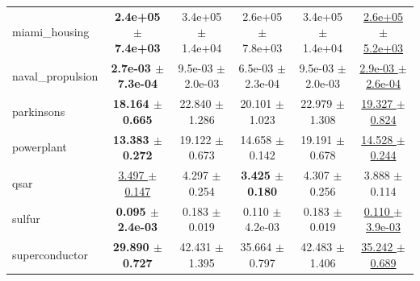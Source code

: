 \begin{table}[!htbp]
{\begin{tabular}{lccccc}
miami\_housing & \textbf{2.4e+05 $\pm$ 7.4e+03} & 3.4e+05 $\pm$ 1.4e+04 & 2.6e+05 $\pm$ 7.8e+03 & 3.4e+05 $\pm$ 1.4e+04 & \underline{2.6e+05 $\pm$ 5.2e+03} \\
naval\_propulsion & \textbf{2.7e-03 $\pm$ 7.3e-04} & 9.5e-03 $\pm$ 2.0e-03 & 6.5e-03 $\pm$ 2.3e-04 & 9.5e-03 $\pm$ 2.0e-03 & \underline{2.9e-03 $\pm$ 2.6e-04} \\
parkinsons & \textbf{18.164 $\pm$ 0.665} & 22.840 $\pm$ 1.286 & 20.101 $\pm$ 1.023 & 22.979 $\pm$ 1.308 & \underline{19.327 $\pm$ 0.824} \\
powerplant & \textbf{13.383 $\pm$ 0.272} & 19.122 $\pm$ 0.673 & 14.658 $\pm$ 0.142 & 19.191 $\pm$ 0.678 & \underline{14.528 $\pm$ 0.244} \\
qsar & \underline{3.497 $\pm$ 0.147} & 4.297 $\pm$ 0.254 & \textbf{3.425 $\pm$ 0.180} & 4.307 $\pm$ 0.256 & 3.888 $\pm$ 0.114 \\
sulfur & \textbf{0.095 $\pm$ 2.4e-03} & 0.183 $\pm$ 0.019 & 0.110 $\pm$ 4.2e-03 & 0.183 $\pm$ 0.019 & \underline{0.110 $\pm$ 3.9e-03} \\
superconductor & \textbf{29.890 $\pm$ 0.727} & 42.431 $\pm$ 1.395 & 35.664 $\pm$ 0.797 & 42.483 $\pm$ 1.406 & \underline{35.242 $\pm$ 0.689} \\
\bottomrule
\end{tabular}
}
\end{table}